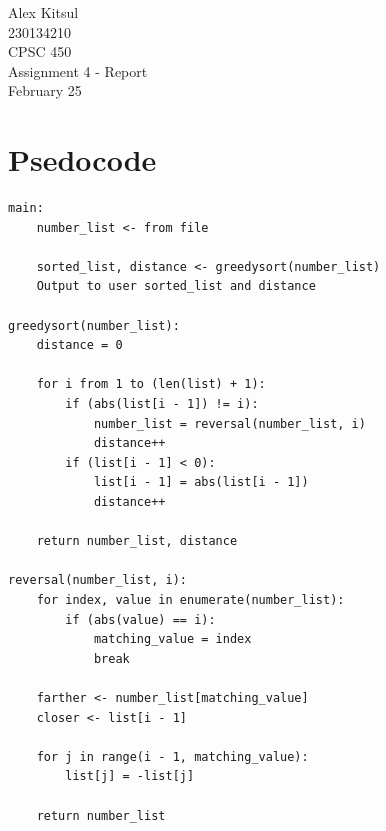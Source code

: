 \documentclass{article}
\begin{document}
\thispagestyle{empty}
\begin{center}
\vspace*{\fill}
\Huge Alex Kitsul\\
\Huge 230134210\\
\Huge CPSC 450\\
\Huge Assignment 4 - Report\\
\Huge February 25\\
\vspace*{\fill}
\end{center}
\pagebreak

\section*{Psedocode}
\begin{lstlisting}
main:
	number_list <- from file
	
	sorted_list, distance <- greedysort(number_list)
	Output to user sorted_list and distance
	
greedysort(number_list):
	distance = 0
	
	for i from 1 to (len(list) + 1):
		if (abs(list[i - 1]) != i):
			number_list = reversal(number_list, i)
			distance++
		if (list[i - 1] < 0):
			list[i - 1] = abs(list[i - 1])
			distance++

	return number_list, distance
			
reversal(number_list, i):
	for index, value in enumerate(number_list):
		if (abs(value) == i):
			matching_value = index
			break
			
	farther <- number_list[matching_value]
	closer <- list[i - 1]
	
	for j in range(i - 1, matching_value):
		list[j] = -list[j]
		
	return number_list
		
\end{lstlisting}

\pagebreak
\end{document}
